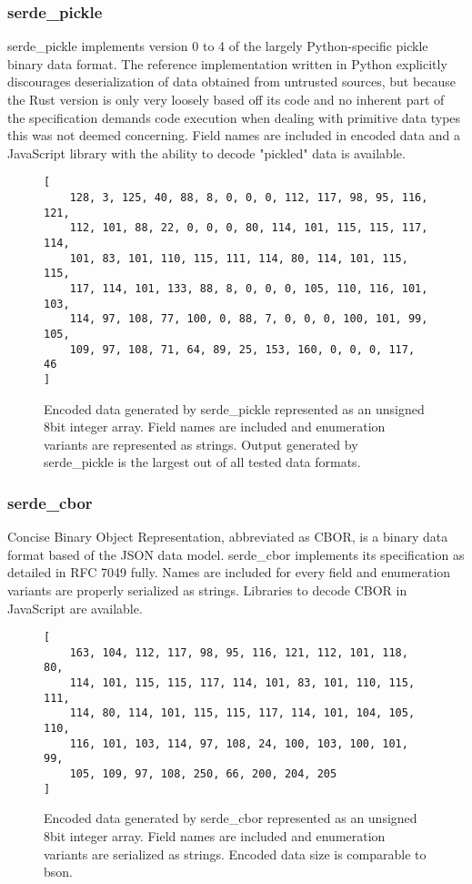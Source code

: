 \subsubsection{serde\_pickle}
serde\_pickle implements version 0 to 4 of the largely Python-specific pickle binary data format. The reference implementation written in Python explicitly discourages deserialization of data obtained from untrusted sources, but because the Rust version is only very loosely based off its code and no inherent part of the specification demands code execution when dealing with primitive data types this was not deemed concerning. Field names are included in encoded data and a JavaScript library with the ability to decode "pickled" data is available.
\begin{figure}[H]
\begin{verbatim}
[
	128, 3, 125, 40, 88, 8, 0, 0, 0, 112, 117, 98, 95, 116, 121, 
	112, 101, 88, 22, 0, 0, 0, 80, 114, 101, 115, 115, 117, 114, 
	101, 83, 101, 110, 115, 111, 114, 80, 114, 101, 115, 115, 
	117, 114, 101, 133, 88, 8, 0, 0, 0, 105, 110, 116, 101, 103, 
	114, 97, 108, 77, 100, 0, 88, 7, 0, 0, 0, 100, 101, 99, 105, 
	109, 97, 108, 71, 64, 89, 25, 153, 160, 0, 0, 0, 117, 46
]
\end{verbatim}
\caption{Encoded data generated by serde\_pickle represented as an unsigned 8bit integer array. Field names are included and enumeration variants are represented as strings. Output generated by serde\_pickle is the largest out of all tested data formats.} 
\end{figure}

\subsubsection{serde\_cbor}
Concise Binary Object Representation, abbreviated as CBOR, is a binary data format based of the JSON data model. serde\_cbor implements its specification as detailed in RFC 7049 \cite{rfc-7049} fully. Names are included for every field and enumeration variants are properly serialized as strings. Libraries to decode CBOR in JavaScript are available.
\begin{figure}[H]
\begin{verbatim}
[
	163, 104, 112, 117, 98, 95, 116, 121, 112, 101, 118, 80, 
	114, 101, 115, 115, 117, 114, 101, 83, 101, 110, 115, 111, 
	114, 80, 114, 101, 115, 115, 117, 114, 101, 104, 105, 110, 
	116, 101, 103, 114, 97, 108, 24, 100, 103, 100, 101, 99, 
	105, 109, 97, 108, 250, 66, 200, 204, 205
]
\end{verbatim}
\caption{Encoded data generated by serde\_cbor represented as an unsigned 8bit integer array. Field names are included and enumeration variants are serialized as strings. Encoded data size is comparable to bson.} 
\end{figure}

